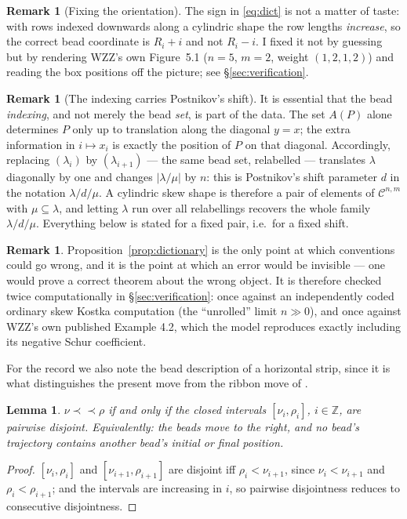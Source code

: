 \documentclass[11pt]{article}
\theoremstyle{plain}
\newtheorem{lem}[thm]{Lemma}
\theoremstyle{definition}
\newtheorem{rem}[thm]{Remark}
\newcommand{\Z}{\mathbb{Z}}
\newcommand{\cyl}{\mathcal{C}}
\newcommand{\hstrip}{\prec\!\!\prec}
\begin{document}
\begin{rem}[Fixing the orientation]\label{rem:orient}
The sign in \eqref{eq:dict} is not a matter of taste: with rows indexed downwards along a
cylindric shape the row lengths \emph{increase}, so the correct bead coordinate is
$R_i+i$ and not $R_i-i$. I fixed it not by guessing but by rendering WZZ's own
Figure~5.1 ($n=5$, $m=2$, weight $(1,2,1,2)$) and reading the box positions off the picture;
see \S\ref{sec:verification}.
\end{rem}

\begin{rem}[The indexing carries Postnikov's shift]\label{rem:shift}
It is essential that the bead \emph{indexing}, and not merely the bead \emph{set}, is part of
the data. The set $A(P)$ alone determines $P$ only up to translation along the diagonal
$y=x$; the extra information in $i\mapsto x_i$ is exactly the position of $P$ on that diagonal.
Accordingly, replacing $(\lambda_i)$ by $(\lambda_{i+1})$ --- the same bead set, relabelled ---
translates $\lambda$ diagonally by one and changes $|\lambda/\mu|$ by $n$: this is Postnikov's
shift parameter $d$ in the notation $\lambda/d/\mu$. A cylindric skew shape is therefore a pair
of elements of $\cyl^{n,m}$ with $\mu\subseteq\lambda$, and letting $\lambda$ run over all
relabellings recovers the whole family $\lambda/d/\mu$. Everything below is stated for a fixed
pair, i.e.\ for a fixed shift.
\end{rem}

\begin{rem}
Proposition~\ref{prop:dictionary} is the only point at which conventions could go wrong, and it
is the point at which an error would be invisible --- one would prove a correct theorem about
the wrong object. It is therefore checked twice computationally in \S\ref{sec:verification}:
once against an independently coded ordinary skew Kostka computation (the ``unrolled'' limit
$n\gg 0$), and once against WZZ's own published Example 4.2, which the model reproduces exactly
including its negative Schur coefficient.
\end{rem}

For the record we also note the bead description of a horizontal strip, since it is what
distinguishes the present move from the ribbon move of \cite{Nap}.

\begin{lem}\label{lem:hstrip}
$\nu\hstrip\rho$ if and only if the closed intervals $[\nu_i,\rho_i]$, $i\in\Z$, are pairwise
disjoint. Equivalently: the beads move to the right, and no bead's trajectory contains another
bead's initial or final position.
\end{lem}
\begin{proof}
$[\nu_i,\rho_i]$ and $[\nu_{i+1},\rho_{i+1}]$ are disjoint iff $\rho_i<\nu_{i+1}$, since
$\nu_i<\nu_{i+1}$ and $\rho_i<\rho_{i+1}$; and the intervals are increasing in $i$, so pairwise
disjointness reduces to consecutive disjointness.
\end{proof}
\end{document}
